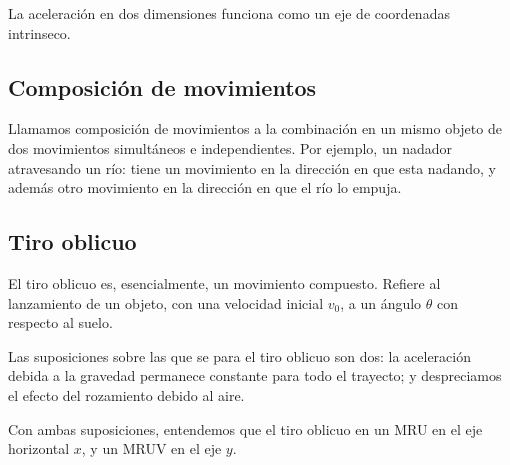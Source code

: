 La aceleración en dos dimensiones funciona como 
un eje de coordenadas intrinseco.

\subsection{Composición de movimientos}

Llamamos composición de movimientos a la combinación en un mismo objeto de 
dos movimientos simultáneos e independientes.
Por ejemplo, un nadador atravesando un río:
tiene un movimiento en la dirección en que esta nadando,
y además otro movimiento en la dirección en que el río lo empuja.

\subsection{Tiro oblicuo}

El tiro oblicuo es, esencialmente, un movimiento compuesto.
Refiere al lanzamiento de un objeto,
con una velocidad inicial \(v_0\),
a un ángulo \(\theta\) con respecto al suelo.

Las suposiciones sobre las que se para el tiro oblicuo son dos:
la aceleración debida a la gravedad permanece constante para todo el trayecto;
y despreciamos el efecto del rozamiento debido al aire.

Con ambas suposiciones,
entendemos que el tiro oblicuo en un MRU en el eje horizontal \(x\),
y un MRUV en el eje \(y\).

